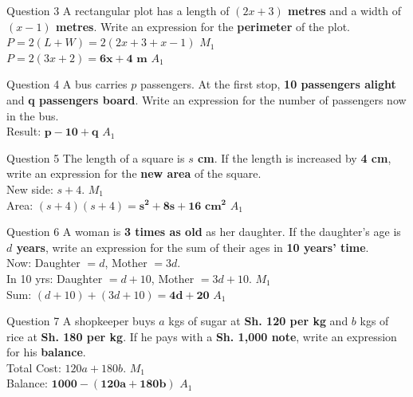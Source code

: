 \documentclass[12pt, a4paper, oneside]{article}
\begin{document}
\begin{solvingbox}{Question 3}
A rectangular plot has a length of \textbf{$(2x + 3)$ metres} and a width of \textbf{$(x - 1)$ metres}. Write an expression for the \textbf{perimeter} of the plot. \\
$P = 2(L + W) = 2(2x + 3 + x - 1)$ \hfill $M_1$ \\
$P = 2(3x + 2) = \mathbf{6x + 4\text{ m}}$ \hfill $A_1$
\end{solvingbox}

\begin{solvingbox}{Question 4}
A bus carries $p$ passengers. At the first stop, \textbf{10 passengers alight} and \textbf{q passengers board}. Write an expression for the number of passengers now in the bus. \\
Result: $\mathbf{p - 10 + q}$ \hfill $A_1$
\end{solvingbox}

\begin{solvingbox}{Question 5}
The length of a square is \textbf{$s$ cm}. If the length is increased by \textbf{4 cm}, write an expression for the \textbf{new area} of the square. \\
New side: $s + 4$. \hfill $M_1$ \\
Area: $(s + 4)(s + 4) = \mathbf{s^2 + 8s + 16\text{ cm}^2}$ \hfill $A_1$
\end{solvingbox}

\begin{solvingbox}{Question 6}
A woman is \textbf{3 times as old} as her daughter. If the daughter's age is \textbf{$d$ years}, write an expression for the sum of their ages in \textbf{10 years' time}. \\
Now: Daughter $= d$, Mother $= 3d$. \\
In 10 yrs: Daughter $= d+10$, Mother $= 3d+10$. \hfill $M_1$ \\
Sum: $(d+10) + (3d+10) = \mathbf{4d + 20}$ \hfill $A_1$
\end{solvingbox}

\begin{solvingbox}{Question 7}
A shopkeeper buys $a$ kgs of sugar at \textbf{Sh. 120 per kg} and $b$ kgs of rice at \textbf{Sh. 180 per kg}. If he pays with a \textbf{Sh. 1,000 note}, write an expression for his \textbf{balance}. \\
Total Cost: $120a + 180b$. \hfill $M_1$ \\
Balance: $\mathbf{1000 - (120a + 180b)}$ \hfill $A_1$
\end{solvingbox}
\end{document}
